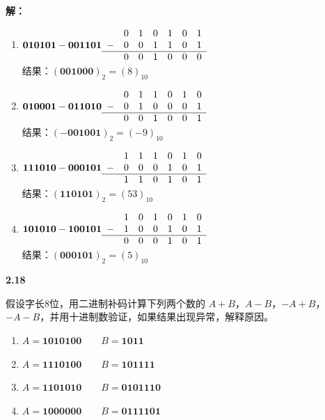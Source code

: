\documentclass[10pt, a4paper]{article}
\newcommand{\question}[2]{
    \vspace{2ex}\noindent\textbf{#1}\ {\kaishu #2} \par\vspace{1ex}
}
\newcommand{\solution}[1]{
    \noindent\textbf{解：}{\songti #1} \par\vspace{3ex}
}
\begin{document}
\solution{
\begin{enumerate}
    \item $ \textbf{010101} - \textbf{001101} \\
    \begin{array}{rrrrrrrr}
        &0&1&0&1&0&1\\
       -&0&0&1&1&0&1\\
        \hline
        &0&0&1&0&0&0
    \end{array} $ \\
    结果：$ (\textbf{001000})_2 = (8)_{10} $

    \item $ \textbf{010001} - \textbf{011010} \\
    \begin{array}{rrrrrrrr}
        &0&1&1&0&1&0\\
       -&0&1&0&0&0&1\\
        \hline
        &0&0&1&0&0&1
    \end{array} $ \\
    结果：$ (-\textbf{001001})_2 = (-9)_{10} $

    \item $ \textbf{111010} - \textbf{000101} \\
    \begin{array}{rrrrrrrr}
        &1&1&1&0&1&0\\
       -&0&0&0&1&0&1\\
        \hline
        &1&1&0&1&0&1
    \end{array} $ \\
    结果：$ (\textbf{110101})_2 = (53)_{10} $

    \item $ \textbf{101010} - \textbf{100101} \\
    \begin{array}{rrrrrrrr}
        &1&0&1&0&1&0\\
       -&1&0&0&1&0&1\\
        \hline
        &0&0&0&1&0&1
    \end{array} $ \\
    结果：$ (\textbf{000101})_2 = (5)_{10} $
\end{enumerate}
}

\question{2.18}{
假设字长8位，用二进制补码计算下列两个数的 $ A + B $，$ A - B $，$ - A + B $，$ - A - B $，并用十进制数验证，如果结果出现异常，解释原因。
\begin{enumerate}
    \item $ A =\textbf{1010100} \qquad B = \textbf{1011} $
    \item $ A =\textbf{1110100} \qquad B = \textbf{101111} $
    \item $ A =\textbf{1101010} \qquad B = \textbf{0101110} $
    \item $ A =\textbf{1000000} \qquad B = \textbf{0111101} $
\end{enumerate}
}
\end{document}
